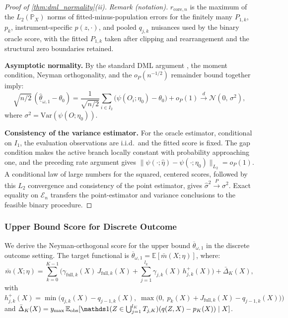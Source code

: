 \begin{proof}[Proof of \cref{thm:dml_normality}\textup{(ii)}]
\noindent\textit{Remark (notation).} $r_{\mathrm{core},n}$ is the maximum of the $L_2(\mathbb P_X)$ norms of fitted-minus-population errors for the finitely many $P_{1,k}$, $p_k$, instrument-specific $p(z,\cdot)$, and pooled $q_{j,k}$ nuisances used by the binary oracle score, with the fitted $P_{1,k}$ taken after clipping and rearrangement and the structural zero boundaries retained.


\medskip
\noindent\textbf{Asymptotic normality.}
By the standard DML argument \citep{chernozhukov2018double}, the moment condition, Neyman orthogonality, and the $o_P(n^{-1/2})$ remainder bound together imply:
\[
    \sqrt{n/2}\,(\hat{\underline{\theta}}_{\omega,1} - \theta_0) = \frac{1}{\sqrt{n/2}}\sum_{i \in I_2}\bigl(\psi(O_i;\eta_0) - \theta_0\bigr) + o_P(1) \xrightarrow{d} \mathcal{N}(0,\,\sigma^2),
\]
where $\sigma^2 = \mathrm{Var}(\psi(O;\eta_0))$.

\medskip
\noindent\textbf{Consistency of the variance estimator.}
For the oracle estimator, conditional on $I_1$, the evaluation observations are i.i.d.\ and the fitted score is fixed. The gap condition makes the active branch locally constant with probability approaching one, and the preceding rate argument gives $\|\psi(\cdot;\hat\eta)-\psi(\cdot;\eta_0)\|_{L_2}=o_P(1)$. A conditional law of large numbers for the squared, centered scores, followed by this $L_2$ convergence and consistency of the point estimator, gives $\hat{\sigma}^2 \xrightarrow{P} \sigma^2$. Exact equality on $\mathcal E_n$ transfers the point-estimator and variance conclusions to the feasible binary procedure.
\end{proof}



\iffalse
\subsubsection{Upper Bound Score for Discrete Outcome}\label{app:upper_bound_discrete}

We derive the Neyman-orthogonal score for the upper bound $\overline{\theta}_{\omega,1}$ in the discrete outcome setting. The target functional is $\overline{\theta}_{\omega,1} = \mathbb{E}[\bar{m}(X;\eta)]$, where:
\begin{equation*}
    \bar{m}(X;\eta) = \sum_{k=0}^{K-1}\bigg(\gamma_{\mathrm{full},k}(X)\,J_{\mathrm{full},k}(X) + \sum_{j=1}^{l_k}\gamma_{j,k}(X)\,h_{j,k}^+(X)\bigg) + \bar{\Delta}_K(X),
\end{equation*}
with $h_{j,k}^+(X) = \min\!\big(q_{j,k}(X) - q_{j-1,k}(X),\;\max\!\big(0,\;p_k(X) + J_{\mathrm{full},k}(X) - q_{j-1,k}(X)\big)\big)$ and $\bar{\Delta}_K(X) = y_{\max}\,\mathbb{E}_{\mathrm{obs}}[\indicator(Z \in \bigcup_{j=1}^{l_K} T_{j,K})(q(Z,X) - p_K(X)) \mid X]$.

